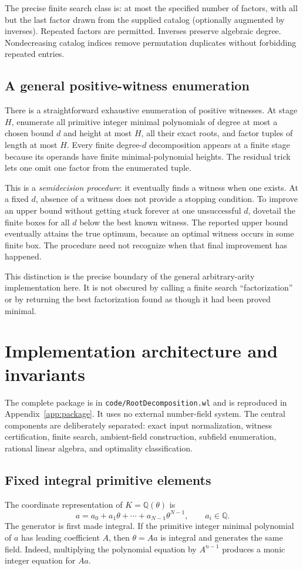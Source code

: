 \documentclass[11pt,a4paper]{article}
\theoremstyle{definition}\newtheorem{definition}[theorem]{Definition}
\theoremstyle{remark}\newtheorem{remark}[theorem]{Remark}
\newcommand{\Q}{\mathbb Q}\newcommand{\C}{\mathbb C}\newcommand{\Z}{\mathbb Z}
\newcommand{\wl}[1]{\texttt{#1}}
\begin{document}
The precise finite search class is: at most the specified number of factors, with all but the last factor drawn from the supplied catalog (optionally augmented by inverses). Repeated factors are permitted. Inverses preserve algebraic degree. Nondecreasing catalog indices remove permutation duplicates without forbidding repeated entries.

\subsection{A general positive-witness enumeration}
There is a straightforward exhaustive enumeration of positive witnesses. At stage $H$, enumerate all primitive integer minimal polynomials of degree at most a chosen bound $d$ and height at most $H$, all their exact roots, and factor tuples of length at most $H$. Every finite degree-$d$ decomposition appears at a finite stage because its operands have finite minimal-polynomial heights. The residual trick lets one omit one factor from the enumerated tuple.

This is a \emph{semidecision procedure}: it eventually finds a witness when one exists. At a fixed $d$, absence of a witness does not provide a stopping condition. To improve an upper bound without getting stuck forever at one unsuccessful $d$, dovetail the finite boxes for all $d$ below the best known witness. The reported upper bound eventually attains the true optimum, because an optimal witness occurs in some finite box. The procedure need not recognize when that final improvement has happened.

This distinction is the precise boundary of the general arbitrary-arity implementation here. It is not obscured by calling a finite search ``factorization'' or by returning the best factorization found as though it had been proved minimal.

\section{Implementation architecture and invariants}
\label{sec:implementation}
The complete package is in \wl{code/RootDecomposition.wl} and is reproduced in Appendix~\ref{app:package}. It uses no external number-field system. The central components are deliberately separated: exact input normalization, witness certification, finite search, ambient-field construction, subfield enumeration, rational linear algebra, and optimality classification.

\subsection{Fixed integral primitive elements}
The coordinate representation of $K=\Q(\theta)$ is
\[
 a=a_0+a_1\theta+\cdots+a_{N-1}\theta^{N-1},\qquad a_i\in\Q.
\]
The generator is first made integral. If the primitive integer minimal polynomial of $a$ has leading coefficient $A$, then $\theta=Aa$ is integral and generates the same field. Indeed, multiplying the polynomial equation by $A^{n-1}$ produces a monic integer equation for $Aa$.
\end{document}
